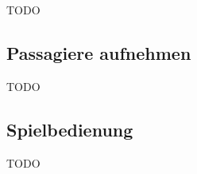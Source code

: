 \documentclass[12pt,a4paper, ngerman, oneside]{scrartcl}
\begin{document}
TODO

\subsection{Passagiere aufnehmen}

TODO

\subsection{Spielbedienung}

TODO
\end{document}
